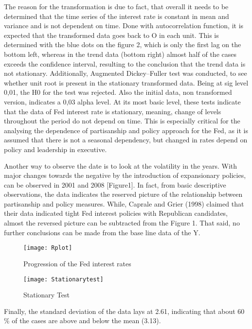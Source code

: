 \documentclass[11pt]{article}
\begin{document}
 The reason for the transformation is due to fact, that overall it needs to be determined that the time series of the interest rate is constant in mean and variance and is not dependent on time. Done with autocorrelation function, it is expected that the transformed data goes back to O in each unit. This is determined with the blue dots on the figure 2, which is only the first lag on the bottom left, whereas in the trend data (bottom right) almost half of the cases exceeds the confidence interval, resulting to the conclusion that the trend data is not stationary.
 Additionally, Augmented Dickey–Fuller test was conducted, to see whether unit root is present in the stationary transformed data. Being at sig level 0,01, the H0 for the test was rejected. Also the initial data, non transformed version, indicates a 0,03 alpha level. At its most basic level, these tests indicate that the data of Fed interest rate is stationary, meaning, change of levels throughout the period do not depend on time. This is especially critical for the analysing the dependence of partisanship and policy approach for the Fed, as it is assumed that there is not a seasonal dependency, but changed in rates depend on policy and leadership in executive. 
\

Another way to observe the date is to look at the volatility in the years. With major changes towards the negative by the introduction of expansionary policies, can be observed in 2001 and 2008 [Figure1]. In fact, from basic descriptive observations, the data indicates the reserved picture of the relationship between partisanship and policy measures. While, Caprale and Grier (1998) claimed that their data indicated tight Fed interest policies with Republican candidates, almost the reversed picture can be subtracted from the Figure 1. That said, no further conclusions can be made from the base line data of the Y.

\begin{figure}
	\center
	\texttt{[image: Rplot]}
	\caption{Progression of the Fed interest rates}
\end{figure}

\begin{figure}
	\centering
		\texttt{[image: Stationarytest]}
		\caption{Stationary Test}
\end{figure}


Finally, the standard deviation of the data lays at 2.61, indicating that about 60 \% of the cases are above and below the mean (3.13).
\
\end{document}
